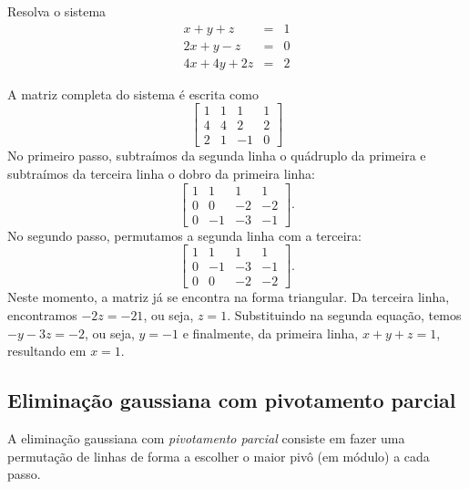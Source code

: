 \begin{ex} Resolva o sistema
  \begin{eqnarray*}
    x+y+z  &=& 1\\
    2x+y-z &=& 0\\
    4x+4y+2z&=& 2
  \end{eqnarray*}
\end{ex}
\begin{sol}
A matriz completa do sistema é escrita como
\begin{equation*}
  \left[\begin{array}{ccc|c}
      {1} &1& 1&1\\
      4 & 4 &2&2\\
      2 &1& -1&0
    \end{array}\right] 
\end{equation*}
No primeiro passo, subtraímos da segunda linha o quádruplo da primeira e subtraímos da terceira linha o dobro da primeira linha:
\begin{equation*}
  \left[\begin{array}{ccc|c}
      {1} &1& 1&1\\
       0 & 0 &-2&-2\\
       0 &-1& -3&-1
    \end{array}\right].
\end{equation*}
No segundo passo, permutamos a segunda linha com a terceira:
\begin{equation*}
  \left[\begin{array}{ccc|c}
      {1} &1& 1&1\\
       0 &-1& -3&-1\\
       0 & 0 &-2&-2
       \end{array}\right].
\end{equation*}
Neste momento, a matriz já se encontra na forma triangular. Da terceira linha, encontramos $-2z=-21$, ou seja, $z=1$. Substituindo na segunda equação, temos $-y-3z=-2$, ou seja, $y=-1$ e finalmente, da primeira linha, $x+y+z=1$, resultando em $x=1$.
\end{sol}

\subsection{Eliminação gaussiana com pivotamento parcial}
A eliminação gaussiana com \emph{pivotamento parcial} consiste em fazer uma permutação de linhas de forma a escolher o maior pivô (em módulo) a cada passo.

